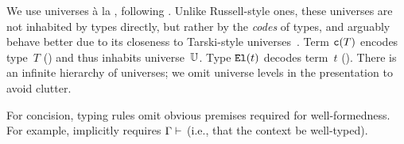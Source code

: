 
We use universes à la \citet{coquand2013presheaf}, following \citet{kaposi2019gluing}.
Unlike Russell-style ones, these universes are not inhabited by types directly,
but rather by the \emph{codes} of types,
and arguably behave better due to its closeness to Tarski-style universes~\cite{luo2012notes}. 
Term $\texttt{c}({T})$ encodes type~$T$ () and thus inhabits universe~$\mathbb{U}$.
Type $\texttt{El}({t})$ decodes term~$t$ ().
There is an infinite hierarchy of universes;
we omit universe levels in the presentation to avoid clutter.

For concision, typing rules omit obvious premises required for well-formedness.
For example,  implicitly requires $ {\Gamma} \vdash_{} $
(i.e., that the context be well-typed).

